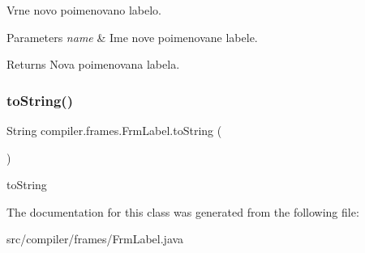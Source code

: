 Vrne novo poimenovano labelo.


\begin{DoxyParams}{Parameters}
{\em name} & Ime nove poimenovane labele. \\
\hline
\end{DoxyParams}
\begin{DoxyReturn}{Returns}
Nova poimenovana labela. 
\end{DoxyReturn}
\mbox{\label{classcompiler_1_1frames_1_1_frm_label_a41c43f0b6fdbc91ba9a221eb1afe4b77}} 
\subsubsection{\texorpdfstring{to\+String()}{toString()}}
{\footnotesize\ttfamily String compiler.\+frames.\+Frm\+Label.\+to\+String (\begin{DoxyParamCaption}{ }\end{DoxyParamCaption})}

to\+String 

The documentation for this class was generated from the following file\+:\begin{DoxyCompactItemize}
\item 
src/compiler/frames/Frm\+Label.\+java\end{DoxyCompactItemize}
